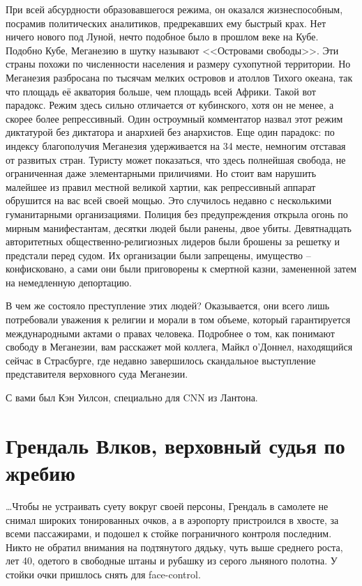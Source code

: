 При всей абсурдности образовавшегося режима, он оказался жизнеспособным, посрамив политических аналитиков, предрекавших ему быстрый крах. Нет ничего нового под Луной, нечто подобное было в прошлом веке на Кубе. Подобно Кубе, Меганезию в шутку называют <<Островами свободы>>. Эти страны похожи по численности населения и размеру сухопутной территории. Но Меганезия разбросана по тысячам мелких островов и атоллов Тихого океана, так что площадь её акватория больше, чем площадь всей Африки. Такой вот парадокс. Режим здесь сильно отличается от кубинского, хотя он не менее, а скорее более репрессивный. Один остроумный комментатор назвал этот режим диктатурой без диктатора и анархией без анархистов. Еще один парадокс: по индексу благополучия Меганезия удерживается на 34 месте, немногим отставая от развитых стран. Туристу может показаться, что здесь полнейшая свобода, не ограниченная даже элементарными приличиями. Но стоит вам нарушить малейшее из правил местной великой хартии, как репрессивный аппарат обрушится на вас всей своей мощью. Это случилось недавно с несколькими гуманитарными организациями. Полиция без предупреждения открыла огонь по мирным манифестантам, десятки людей были ранены, двое убиты. Девятнадцать авторитетных общественно-религиозных лидеров были брошены за решетку и предстали перед судом. Их организации были запрещены, имущество -- конфисковано, а сами они были приговорены к смертной казни, замененной затем на немедленную депортацию.

В чем же состояло преступление этих людей? Оказывается, они всего лишь потребовали уважения к религии и морали в том объеме, который гарантируется международными актами о правах человека. Подробнее о том, как понимают свободу в Меганезии, вам расскажет мой коллега, Майкл о’Доннел, находящийся сейчас в Страсбурге, где недавно завершилось скандальное выступление представителя верховного суда Меганезии.

С вами был Кэн Уилсон, специально для CNN из Лантона.


\mainmatter
\chapter{Грендаль Влков, верховный судья по жребию}

\ldots{}Чтобы не устраивать суету вокруг своей персоны, Грендаль в самолете не снимал широких тонированных очков, а в аэропорту пристроился в хвосте, за всеми пассажирами, и подошел к стойке пограничного контроля последним. Никто не обратил внимания на подтянутого дядьку, чуть выше среднего роста, лет 40, одетого в свободные штаны и рубашку из серого льняного полотна. У стойки очки пришлось снять для face-control.

